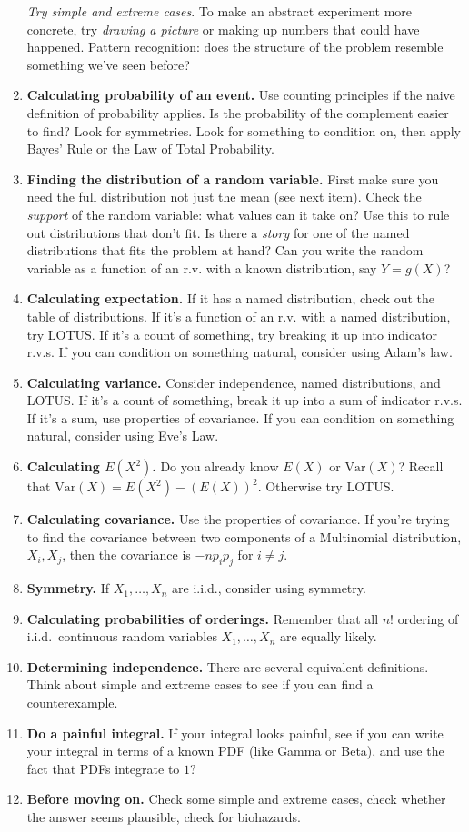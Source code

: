 \documentclass[10pt,landscape]{article}
\newcommand{\var}{\textrm{Var}}
\begin{document}
\begin{multicols*}{3}
\begin{enumerate}
\emph{Try simple and extreme cases}. To make an abstract experiment more concrete, try \emph{drawing a picture} or making up numbers that could have happened. Pattern recognition: does the structure of the problem resemble something we've seen before?
\item \textbf{Calculating probability of an event.} Use counting principles if the naive definition of probability applies. Is the probability of the complement easier to find? Look for symmetries. Look for something to condition on, then apply Bayes' Rule or the Law of Total Probability. 
\item \textbf{Finding the distribution of a random variable.} First make sure you need the full distribution not just the mean (see next item). Check the \emph{support} of the random variable: what values can it take on? Use this to rule out distributions that don't fit.  Is there a \emph{story} for one of the named distributions that fits the problem at hand?  Can you write the random variable as a function of an r.v. with a known distribution, say $Y = g(X)$?
\item \textbf{Calculating expectation.} If it has a named distribution, check out the table of distributions. If it's a function of an r.v. with a named distribution, try LOTUS. If it's a count of something, try breaking it up into indicator r.v.s. If you can condition on something natural, consider using Adam's law. 
\item \textbf{Calculating variance.} Consider independence, named distributions, and LOTUS. If it's a count of something, break it up into a sum of indicator r.v.s. If it's a sum, use properties of covariance. If you can condition on something natural, consider using Eve's Law.
\item \textbf{Calculating $E(X^2)$.}  Do you already know $E(X)$ or $\var(X)$? Recall that $\var(X) = E(X^2) - (E(X))^2$. Otherwise try LOTUS.
\item \textbf{Calculating covariance.} Use the properties of covariance. If you're trying to find the covariance between two components of a Multinomial distribution, $X_i, X_j$, then the covariance is $-np_ip_j$ for $i \neq j$.
\item \textbf{Symmetry.} If $X_1,\dots,X_n$ are i.i.d., consider using symmetry.
\item \textbf{Calculating probabilities of orderings.} Remember that all $n!$ ordering of i.i.d.~continuous random variables $X_1,\dots,X_n$ are equally likely.
\item \textbf{Determining independence.} There are several equivalent definitions. Think about simple and extreme cases to see if you can find a counterexample.
\item \textbf{Do a painful integral.} If your integral looks painful, see if you can write your integral in terms of a known PDF (like Gamma or Beta), and use the fact that PDFs integrate to $1$?
\item \textbf{Before moving on.} Check some simple and extreme cases, check whether the answer seems plausible, check for biohazards.\end{enumerate}



\end{multicols*}
\end{document}
